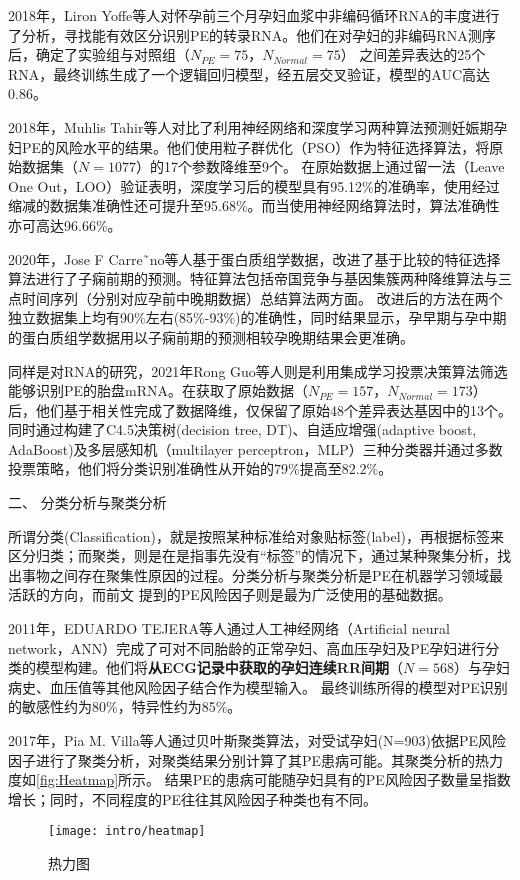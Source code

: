 2018年，Liron Yoffe等人\cite{Yoffe2018}对怀孕前三个月孕妇血浆中非编码循环RNA的丰度进行了分析，寻找能有效区分识别PE的转录RNA。他们在对孕妇的非编码RNA测序后，确定了实验组与对照组（$N_{PE}=75$，$N_{Normal}=75$）
之间差异表达的25个RNA，最终训练生成了一个逻辑回归模型，经五层交叉验证，模型的AUC高达0.86。

2018年，Muhlis Tahir等人\cite{Tahir2018,Tahir2018-2}对比了利用神经网络和深度学习两种算法预测妊娠期孕妇PE的风险水平的结果。他们使用粒子群优化（PSO）作为特征选择算法，将原始数据集（$N=1077$）的17个参数降维至9个。
在原始数据上通过留一法（Leave One Out，LOO）验证表明，深度学习后的模型具有95.12\%的准确率，使用经过缩减的数据集准确性还可提升至95.68\%。而当使用神经网络算法时，算法准确性亦可高达96.66\%。

2020年，Jose F Carre˜no等人\cite{Carreno2020}基于蛋白质组学数据，改进了基于比较的特征选择算法进行了子痫前期的预测。特征算法包括帝国竞争与基因集簇两种降维算法与三点时间序列（分别对应孕前中晚期数据）总结算法两方面。
改进后的方法在两个独立数据集上均有90\%左右(85\%-93\%)的准确性，同时结果显示，孕早期与孕中期的蛋白质组学数据用以子痫前期的预测相较孕晚期结果会更准确。

同样是对RNA的研究，2021年Rong Guo等人\cite{Guo2021}则是利用集成学习投票决策算法筛选能够识别PE的胎盘mRNA。在获取了原始数据（$N_{PE}=157$，$N_{Normal}=173$）后，他们基于相关性完成了数据降维，仅保留了原始48个差异表达基因中的13个。
同时通过构建了C4.5决策树(decision tree, DT)、自适应增强(adaptive boost, AdaBoost)及多层感知机（multilayer perceptron，MLP）三种分类器并通过多数投票策略，他们将分类识别准确性从开始的$79\%$提高至$82.2\%$。

二、 分类分析与聚类分析

所谓分类(Classification)，就是按照某种标准给对象贴标签(label)，再根据标签来区分归类；而聚类，则是在是指事先没有“标签”的情况下，通过某种聚集分析，找出事物之间存在聚集性原因的过程。分类分析与聚类分析是PE在机器学习领域最活跃的方向，而前文
提到的PE风险因子则是最为广泛使用的基础数据。

2011年，EDUARDO TEJERA等人\cite{Tejera2011}通过人工神经网络（Artificial neural network，ANN）完成了可对不同胎龄的正常孕妇、高血压孕妇及PE孕妇进行分类的模型构建。他们将\textbf{从ECG记录中获取的孕妇连续RR间期}（$N=568$）与孕妇病史、血压值等其他风险因子结合作为模型输入。
最终训练所得的模型对PE识别的敏感性约为80\%，特异性约为85\%。

2017年，Pia M. Villa等人\cite{Villa2017}通过贝叶斯聚类算法，对受试孕妇(N=903)依据PE风险因子进行了聚类分析，对聚类结果分别计算了其PE患病可能。其聚类分析的热力度如\autoref{fig:Heatmap}所示。
结果PE的患病可能随孕妇具有的PE风险因子数量呈指数增长；同时，不同程度的PE往往其风险因子种类也有不同。
\begin{figure}[htbp]
    \centering
    \texttt{[image: intro/heatmap]}
    \caption{\label{fig:Heatmap}热力图}
\end{figure}

